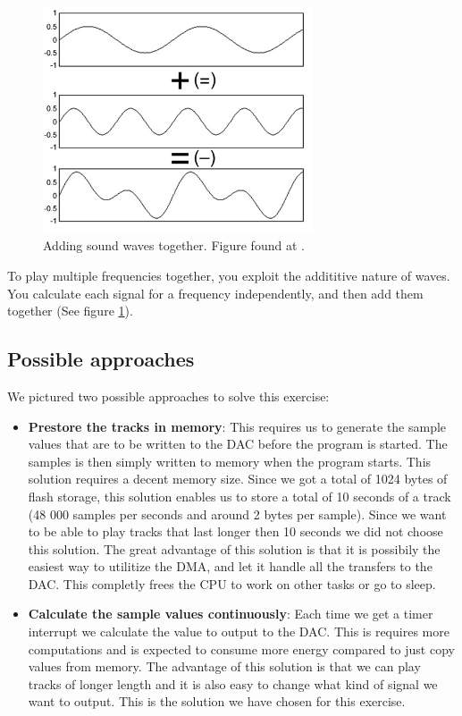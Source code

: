\begin{figure}[h]
	\centering
	\includegraphics[width=8cm]{img/sumofsines.jpg}
	\caption{Adding sound waves together. Figure found at \cite{fourier}.}
	\label{fig:adding_waves}
\end{figure}
To play multiple frequencies together, you exploit the addititive nature of waves. You calculate each signal for a frequency independently, and then add them together (See figure \ref{fig:adding_waves}).

\subsection{Possible approaches}
We pictured two possible approaches to solve this exercise:

\begin{itemize}
	\item \textbf{Prestore the tracks in memory}: This requires us to generate the sample values that are to be written to the DAC before the program is started. The samples is then simply written to memory when the program starts. This solution requires a decent memory size. Since we got a total of 1024 bytes of flash storage, this solution enables us to store a total of 10 seconds of a track (48 000 samples per seconds and around 2 bytes per sample). Since we want to be able to play tracks that last longer then 10 seconds we did not choose this solution. The great advantage of this solution is that it is possibily the easiest way to utilitize the DMA, and let it handle all the transfers to the DAC. This completly frees the CPU to work on other tasks or go to sleep.
	\item \textbf{Calculate the sample values continuously}: Each time we get a timer interrupt we calculate the value to output to the DAC. This is requires more computations and is expected to consume more energy compared to just copy values from memory. The advantage of this solution is that we can play tracks of longer length and it is also easy to change what kind of signal we want to output. This is the solution we have chosen for this exercise.
	   
\end{itemize}

